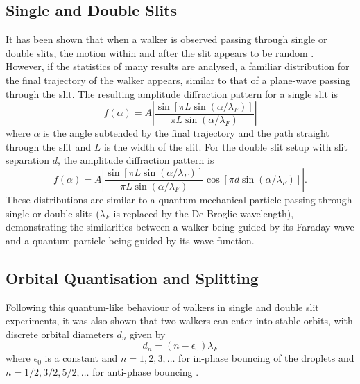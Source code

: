 \documentclass[11pt]{article}
\begin{document}
\subsection{Single and Double Slits}
\label{sec:singleandcoubleslits}
It has been shown that when a walker is observed passing through single or double slits, the motion within and after the slit appears to be random \cite{1}.  However, if the statistics of many results are analysed, a familiar distribution for the final trajectory of the walker appears, similar to that of a plane-wave passing through the slit.  The resulting amplitude diffraction pattern for a single slit is
\begin{equation}
    \label{singleslitamplitude}
    f(\alpha)=A\left|\frac{\sin[\pi L\sin(\alpha/\lambda_F)]}{\pi L\sin(\alpha/\lambda_F)}\right|
\end{equation}
where $\alpha$ is the angle subtended by the final trajectory and the path straight through the slit and $L$ is the width of the slit.  For the double slit setup with slit separation $d$, the amplitude diffraction pattern is
\begin{equation}
    \label{doubleslitamplitude}
    f(\alpha)=A\left|\frac{\sin\left[\pi L\sin(\alpha/\lambda_F)\right]}{\pi L\sin(\alpha/\lambda_F)}\cos\left[\pi d\sin(\alpha/\lambda_F)\right]\right|.
\end{equation}
These distributions are similar to a quantum-mechanical particle passing through single or double slits ($\lambda_F$ is replaced by the De Broglie wavelength), demonstrating the similarities between a walker being guided by its Faraday wave and a quantum particle being guided by its wave-function.

\subsection{Orbital Quantisation and Splitting}
\label{sec:orbitalquantisationandsplitting}
Following this quantum-like behaviour of walkers in single and double slit experiments, it was also shown that two walkers can enter into stable orbits, with discrete orbital diameters $d_n$ given by
\begin{equation}
    \label{orbit}
    d_n=(n-\epsilon_0)\lambda_F
\end{equation}
where $\epsilon_0$ is a constant and $n=1,2,3,\ldots$ for in-phase bouncing of the droplets and $n=1/2,3/2,5/2,\ldots$ for anti-phase bouncing \cite{5,9,6}.
\end{document}
